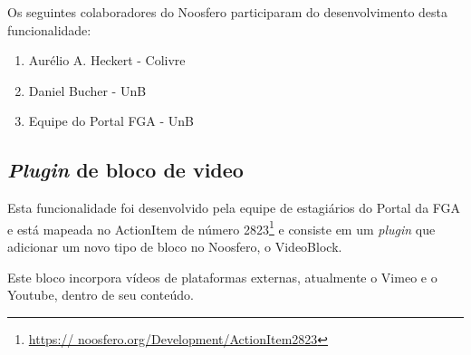 Os seguintes colaboradores do Noosfero participaram do desenvolvimento desta
funcionalidade:

\begin{enumerate}

\item Aurélio A. Heckert - Colivre

\item Daniel Bucher - UnB

\item Equipe do Portal FGA - UnB

\end{enumerate}

\subsection{\textit{Plugin} de bloco de video}

Esta funcionalidade foi desenvolvido pela equipe de estagiários do Portal
da FGA e está mapeada no ActionItem de número 2823\footnote{\url{https://
noosfero.org/Development/ActionItem2823}} e consiste em um \textit{plugin}
que adicionar um novo tipo de bloco no Noosfero, o VideoBlock.

Este bloco incorpora vídeos de plataformas externas, atualmente o Vimeo
e o Youtube, dentro de seu conteúdo.

